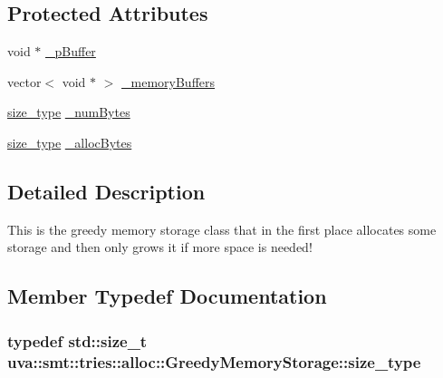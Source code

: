 \subsection*{Protected Attributes}
\begin{DoxyCompactItemize}
\item 
void $\ast$ \hyperlink{classuva_1_1smt_1_1tries_1_1alloc_1_1_greedy_memory_storage_a1c8ad9025dcdf7c396b72cb06a67662a}{\+\_\+p\+Buffer}
\item 
vector$<$ void $\ast$ $>$ \hyperlink{classuva_1_1smt_1_1tries_1_1alloc_1_1_greedy_memory_storage_a98f1adcd062b5d194b7a4a6053abf539}{\+\_\+memory\+Buffers}
\item 
\hyperlink{classuva_1_1smt_1_1tries_1_1alloc_1_1_greedy_memory_storage_a15b9139bffa854a165a11131725fa903}{size\+\_\+type} \hyperlink{classuva_1_1smt_1_1tries_1_1alloc_1_1_greedy_memory_storage_a256828860dc5ada542a90c80c3f8753d}{\+\_\+num\+Bytes}
\item 
\hyperlink{classuva_1_1smt_1_1tries_1_1alloc_1_1_greedy_memory_storage_a15b9139bffa854a165a11131725fa903}{size\+\_\+type} \hyperlink{classuva_1_1smt_1_1tries_1_1alloc_1_1_greedy_memory_storage_a7364ad54922d2866d881cada8d29017f}{\+\_\+alloc\+Bytes}
\end{DoxyCompactItemize}


\subsection{Detailed Description}
This is the greedy memory storage class that in the first place allocates some storage and then only grows it if more space is needed! 

\subsection{Member Typedef Documentation}
\hypertarget{classuva_1_1smt_1_1tries_1_1alloc_1_1_greedy_memory_storage_a15b9139bffa854a165a11131725fa903}{}
\subsubsection[{size\+\_\+type}]{\setlength{\rightskip}{0pt plus 5cm}typedef std\+::size\+\_\+t {\bf uva\+::smt\+::tries\+::alloc\+::\+Greedy\+Memory\+Storage\+::size\+\_\+type}}\label{classuva_1_1smt_1_1tries_1_1alloc_1_1_greedy_memory_storage_a15b9139bffa854a165a11131725fa903}
\hypertarget{classuva_1_1smt_1_1tries_1_1alloc_1_1_greedy_memory_storage_a382ab7e2f6a10ec5da8de9d836f34f32}{}
